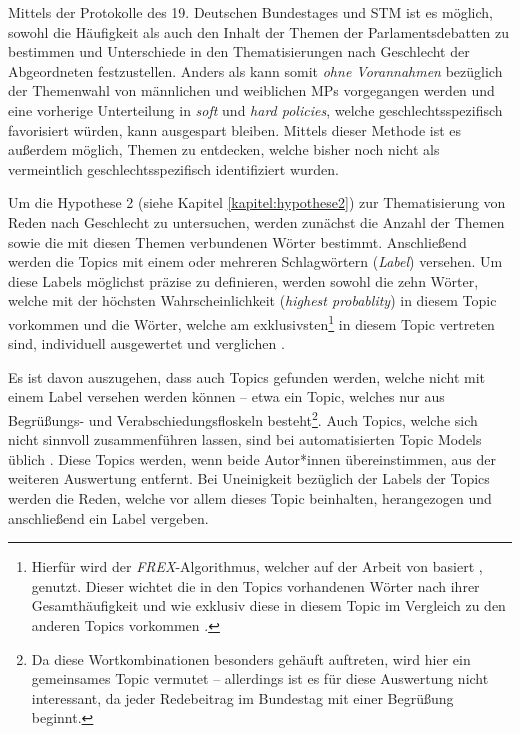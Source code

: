 \documentclass[12pt, 
    twoside=false, 
    bibliography=totoc, 
    numbers=endperiod, 
    headings=normal, 
    toc=chapterentrydotfill
    ]{scrbook}
\begin{document}
Mittels der Protokolle des 19. Deutschen Bundestages und STM ist es möglich, sowohl die Häufigkeit als auch den Inhalt der Themen der Parlamentsdebatten zu bestimmen und Unterschiede in den Thematisierungen nach Geschlecht der Abgeordneten festzustellen. Anders als \textcite{back_2014} kann somit \emph{ohne Vorannahmen} bezüglich der Themenwahl von männlichen und weiblichen MPs vorgegangen werden und eine vorherige Unterteilung in \emph{soft} und \emph{hard policies}, welche geschlechtsspezifisch favorisiert würden, kann ausgespart bleiben. Mittels dieser Methode ist es außerdem möglich, Themen zu entdecken, welche bisher noch nicht als vermeintlich geschlechtsspezifisch identifiziert wurden.

Um die Hypothese 2 (siehe Kapitel \ref{kapitel:hypothese2}) zur Thematisierung von Reden nach Geschlecht zu untersuchen, werden zunächst die Anzahl der Themen sowie die mit diesen Themen verbundenen Wörter bestimmt. Anschließend werden die Topics mit einem oder mehreren Schlagwörtern (\emph{Label}) versehen. Um diese Labels möglichst präzise zu definieren, werden sowohl die zehn Wörter, welche mit der höchsten Wahrscheinlichkeit (\emph{highest probablity}) in diesem Topic vorkommen und die Wörter, welche am exklusivsten\footnote{Hierfür wird der \emph{FREX}-Algorithmus, welcher auf der Arbeit von \textcite{airoldi_2016} basiert \parencite[12]{roberts_2018}, genutzt. Dieser wichtet die in den Topics vorhandenen Wörter nach ihrer Gesamthäufigkeit und wie exklusiv diese in diesem Topic im Vergleich zu den anderen Topics vorkommen \parencite[13f.]{roberts_2018}.} in diesem Topic vertreten sind, individuell ausgewertet und verglichen \parencite[13f.]{roberts_2018}. 

Es ist davon auszugehen, dass auch Topics gefunden werden, welche nicht mit einem Label versehen werden können -- etwa ein Topic, welches nur aus Begrüßungs- und Verabschiedungsfloskeln besteht\footnote{Da diese Wortkombinationen besonders gehäuft auftreten, wird hier ein gemeinsames Topic vermutet -- allerdings ist es für diese Auswertung nicht interessant, da jeder Redebeitrag im Bundestag mit einer Begrüßung beginnt.}. Auch Topics, welche sich nicht sinnvoll zusammenführen lassen, sind bei automatisierten Topic Models üblich \parencites[262]{mimno_2011}[11]{grajzl_2018}. Diese Topics werden, wenn beide Autor*innen übereinstimmen, aus der weiteren Auswertung entfernt. Bei Uneinigkeit bezüglich der Labels der Topics werden die Reden, welche vor allem dieses Topic beinhalten, herangezogen und anschließend ein Label vergeben.
\end{document}
